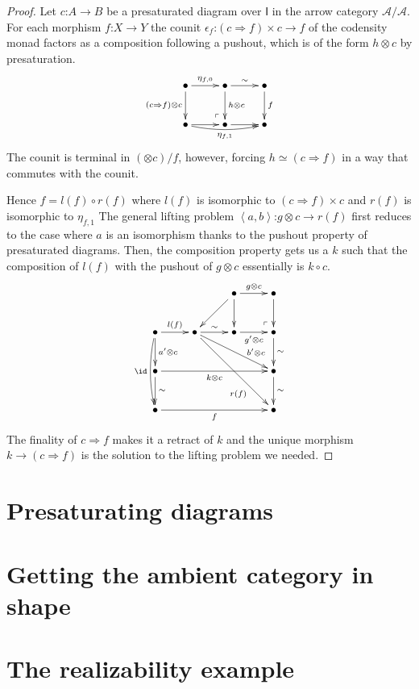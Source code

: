 \documentclass{tac}
\makeatletter
\newcommand\hide[1]{}
\newcommand\cat\mathcal
\newcommand\icat\mathsf
\newcommand\of{\mathord:}
\newcommand\tuplet[1]{\left\langle #1 \right\rangle}
\newcommand\pushed{\ar@{}[ul]|(.2)\ulcorner}
\makeatother
\begin{document}
\begin{proof}
Let $c\of A\to B$ be a presaturated diagram over $\icat I$ in the arrow category $\cat A/\cat A$. 
For each morphism $f\of X\to Y$ the counit $\epsilon_f\of(c\Rightarrow f)\times c\to f$ of the codensity monad factors as a composition following a pushout, which is of the form $h\otimes c$ by presaturation.
\[\xymatrix{
\bullet\ar[d]_{(c\Rightarrow f)\otimes c} \ar[r]^{\eta_{f,0}} & \bullet \ar[d]^{h\otimes c} \ar[r]^\sim & \bullet\ar[d]^f\\
\bullet \ar[r]\ar@/_1ex/[rr]_{\eta_{f,1}} & \bullet\pushed\ar[r] & \bullet
}\]
The counit is terminal in $(\otimes c)/f$, however, forcing $h \simeq (c\Rightarrow f)$ in a way that commutes with the counit.

Hence $f = l(f)\circ r(f)$ where $l(f)$ is isomorphic to $(c\Rightarrow f)\times c$ and $r(f)$ is isomorphic to $\eta_{f,1}$
The general lifting problem $\tuplet{a,b}\of g\otimes c\to r(f)$ first reduces to the case where $a$ is an isomorphism thanks to the pushout property of presaturated diagrams. Then, the composition property gets us a $k$ such that the composition of $l(f)$ with the pushout of $g\otimes c$ essentially is $k\circ c$.
\[\xymatrix{
&& \bullet\ar[r]^{g\otimes c}\ar[d]\ar[dl] & 
\bullet\ar[d]\\ 
\bullet\ar@/_1ex/[dd]_\id\ar[d]^{a'\otimes c}\ar[r]^{l(f)} & 
\bullet\ar[r]^\sim\ar[drr]^(.7){b'\otimes c}\ar[ddrr]_(.7){r(f)} & 
\bullet\ar[r]_{g'\otimes c} & 
\bullet\pushed\ar[d]^\sim\\
\bullet\ar[d]^\sim\ar[rrr]_{k\otimes c} &&& \bullet\ar[d]^\sim \\
\bullet\ar[rrr]_f &&& \bullet 
}\]
The finality of $c\Rightarrow f$ makes it a retract of $k$ and the unique morphism $k\to (c\Rightarrow f)$ is the solution to the lifting problem we needed.
\hide{This feels way too easy.}
\end{proof}


\section{Presaturating diagrams}




\section{Getting the ambient category in shape}
\hide{
- nno's cycles & horns
- W-types
-	etc.
}

\section{The realizability example}
\hide{
- simplicial assemblies & modest sets.
- exact completions for pushouts.
- exact completions as examples of homotopy categories.
}
\end{document}
